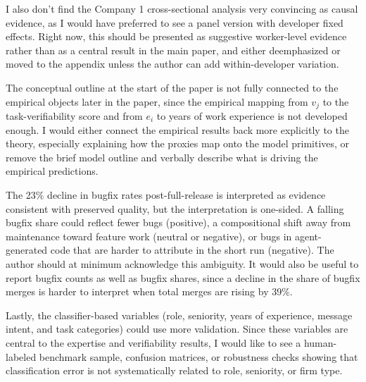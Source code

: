 \documentclass{article}
\begin{document}
I also don't find the Company 1 cross-sectional analysis very convincing as causal evidence, as I would have preferred to see a panel version with developer fixed effects.
Right now, this should be presented as suggestive worker-level evidence rather than as a central result in the main paper, and either deemphasized or moved to the appendix unless the author can add within-developer variation.

The conceptual outline at the start of the paper is not fully connected to the empirical objects later in the paper, since the empirical mapping from $v_j$ to the task-verifiability score and from $e_i$ to years of work experience is not developed enough.
I would either connect the empirical results back more explicitly to the theory, especially explaining how the proxies map onto the model primitives, or remove the brief model outline and verbally describe what is driving the empirical predictions.

The 23\% decline in bugfix rates post-full-release is interpreted as evidence consistent with preserved quality, but the interpretation is one-sided.
A falling bugfix share could reflect fewer bugs (positive), a compositional shift away from maintenance toward feature work (neutral or negative), or bugs in agent-generated code that are harder to attribute in the short run (negative).
The author should at minimum acknowledge this ambiguity.
It would also be useful to report bugfix counts as well as bugfix shares, since a decline in the share of bugfix merges is harder to interpret when total merges are rising by 39\%.

Lastly, the classifier-based variables (role, seniority, years of experience, message intent, and task categories) could use more validation.
Since these variables are central to the expertise and verifiability results, I would like to see a human-labeled benchmark sample, confusion matrices, or robustness checks showing that classification error is not systematically related to role, seniority, or firm type.
\end{document}

